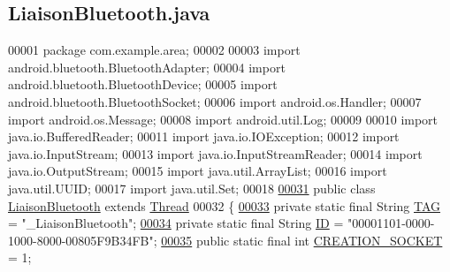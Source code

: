 \hypertarget{_liaison_bluetooth_8java_source}{}\subsection{Liaison\+Bluetooth.\+java}
\label{_liaison_bluetooth_8java_source}

\begin{DoxyCode}
00001 \textcolor{keyword}{package }com.example.area;
00002 
00003 \textcolor{keyword}{import} android.bluetooth.BluetoothAdapter;
00004 \textcolor{keyword}{import} android.bluetooth.BluetoothDevice;
00005 \textcolor{keyword}{import} android.bluetooth.BluetoothSocket;
00006 \textcolor{keyword}{import} android.os.Handler;
00007 \textcolor{keyword}{import} android.os.Message;
00008 \textcolor{keyword}{import} android.util.Log;
00009 
00010 \textcolor{keyword}{import} java.io.BufferedReader;
00011 \textcolor{keyword}{import} java.io.IOException;
00012 \textcolor{keyword}{import} java.io.InputStream;
00013 \textcolor{keyword}{import} java.io.InputStreamReader;
00014 \textcolor{keyword}{import} java.io.OutputStream;
00015 \textcolor{keyword}{import} java.util.ArrayList;
00016 \textcolor{keyword}{import} java.util.UUID;
00017 \textcolor{keyword}{import} java.util.Set;
00018 
\hyperlink{classcom_1_1example_1_1area_1_1_liaison_bluetooth}{00031} \textcolor{keyword}{public} \textcolor{keyword}{class }\hyperlink{classcom_1_1example_1_1area_1_1_liaison_bluetooth}{LiaisonBluetooth} \textcolor{keyword}{extends} \hyperlink{class_thread}{Thread}
00032 \{
\hyperlink{classcom_1_1example_1_1area_1_1_liaison_bluetooth_ac51aa4b63fae5c36734a061cc05d7fc9}{00033}     \textcolor{keyword}{private} \textcolor{keyword}{static} \textcolor{keyword}{final} String \hyperlink{classcom_1_1example_1_1area_1_1_liaison_bluetooth_ac51aa4b63fae5c36734a061cc05d7fc9}{TAG} = \textcolor{stringliteral}{"\_LiaisonBluetooth"};
\hyperlink{classcom_1_1example_1_1area_1_1_liaison_bluetooth_a8f4d17b8ac09c7ba9213163de86fb669}{00034}     \textcolor{keyword}{private} \textcolor{keyword}{static} \textcolor{keyword}{final} String \hyperlink{classcom_1_1example_1_1area_1_1_liaison_bluetooth_a8f4d17b8ac09c7ba9213163de86fb669}{ID} = \textcolor{stringliteral}{"00001101-0000-1000-8000-00805F9B34FB"};
\hyperlink{classcom_1_1example_1_1area_1_1_liaison_bluetooth_ac961c73879bd0de9933b2fc310cc5e7e}{00035}     \textcolor{keyword}{public} \textcolor{keyword}{static} \textcolor{keyword}{final} \textcolor{keywordtype}{int} \hyperlink{classcom_1_1example_1_1area_1_1_liaison_bluetooth_ac961c73879bd0de9933b2fc310cc5e7e}{CREATION\_SOCKET} = 1;

\end{DoxyCode}
